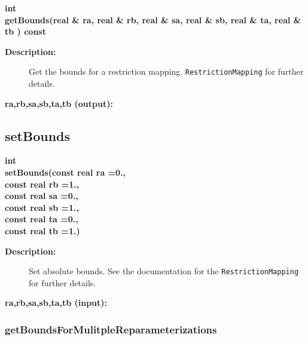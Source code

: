 \begin{flushleft} \textbf{%
int  \\ 
\settowidth{\ReparameterizationTransformIncludeArgIndent}{getBounds(}%
getBounds(real \& ra, real \& rb, real \& sa, real \& sb, real \& ta, real \& tb ) const
}\end{flushleft}
\begin{description}
\item[{\bf Description:}] 
  Get the bounds for a restriction mapping.
   {\tt RestrictionMapping} for further details.
\item[{\bf ra,rb,sa,sb,ta,tb (output):}]  
\end{description}
\subsection{setBounds}
 
\begin{flushleft} \textbf{%
int  \\ 
\settowidth{\ReparameterizationTransformIncludeArgIndent}{setBounds(}%
setBounds(const real ra =0., \\ 
\hspace{\ReparameterizationTransformIncludeArgIndent}const real rb =1., \\ 
\hspace{\ReparameterizationTransformIncludeArgIndent}const real sa =0.,\\ 
\hspace{\ReparameterizationTransformIncludeArgIndent}const real sb =1.,\\ 
\hspace{\ReparameterizationTransformIncludeArgIndent}const real ta =0.,\\ 
\hspace{\ReparameterizationTransformIncludeArgIndent}const real tb   =1.)
}\end{flushleft}
\begin{description}
\item[{\bf Description:}] 
  Set absolute bounds. See the documentation for the
   {\tt RestrictionMapping} for further details.
\item[{\bf ra,rb,sa,sb,ta,tb (input):}]  
\end{description}
\subsubsection{getBoundsForMulitpleReparameterizations}
 
